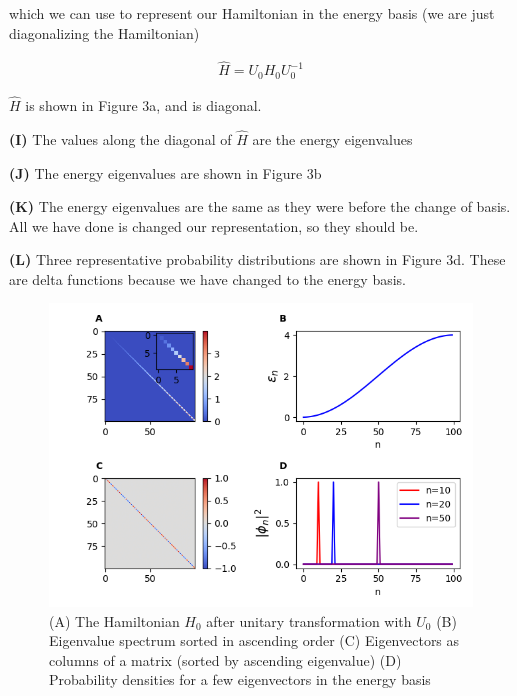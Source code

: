 \documentclass[12pt]{article}
\theoremstyle{definition}
\begin{document}
{which we can use to represent our Hamiltonian in the energy basis (we are just diagonalizing the Hamiltonian)

\begin{align*}
\hat{H} = U_{0} H_{0} U_{0}^{-1}
\end{align*}

$\hat{H}$ is shown in Figure 3a, and is diagonal.

\vspace{0.1in}
\noindent \textbf{(I)} The values along the diagonal of $\hat{H}$ are the energy eigenvalues

\vspace{0.1in}
\noindent \textbf{(J)} The energy eigenvalues are shown in Figure 3b

\vspace{0.1in}
\noindent \textbf{(K)} The energy eigenvalues are the same as they were before the change of basis. All we have done is changed our representation, so they should be. 

\vspace{0.1in}
\noindent \textbf{(L)} Three representative probability distributions are shown in Figure 3d. These are delta functions because we have changed to the energy basis.

\begin{figure}[t!]
\centering
\includegraphics[width=15cm]{Figure_3}
\caption{(A) The Hamiltonian $H_{0}$ after unitary transformation with $U_{0}$ (B) Eigenvalue spectrum sorted in ascending order (C) Eigenvectors as columns of a matrix (sorted by ascending eigenvalue) (D) Probability densities for a few eigenvectors in the energy basis}
\label{fig:method}
\end{figure}

}
\end{document}
